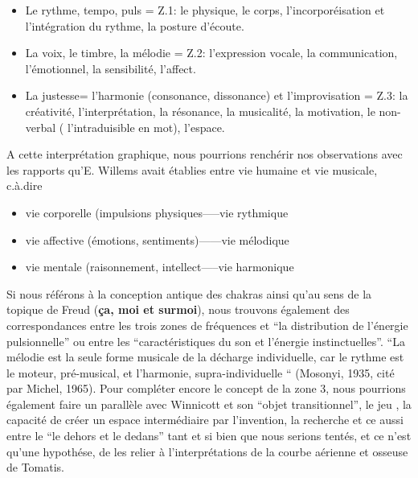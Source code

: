 \begin{itemize}
 \item Le rythme, tempo, puls  =  Z.1: le physique, le corps, l'incorporéisation et
l'intégration du rythme,
la posture d'écoute.

\item La voix, le timbre, la mélodie =  Z.2:  l'expression vocale, la communication,
l'émotionnel, la sensibilité, l'affect.

\item La justesse= l'harmonie (consonance, dissonance) et l'improvisation = Z.3:  la créativité, l'interprétation, la
résonance, la musicalité, la motivation, le non-verbal (
l'intraduisible en mot), l'espace.

\end{itemize}
A cette interprétation graphique, nous pourrions renchérir nos
observations avec les rapports
qu'E.
Willems  avait établies entre vie humaine et vie musicale, c.à.dire
\begin{itemize}
  \item vie corporelle (impulsions physiques-----vie rythmique
  \item vie affective (émotions, sentiments)------vie mélodique
    \item vie mentale (raisonnement, intellect-----vie harmonique
\end{itemize}

Si nous référons à la conception antique des chakras ainsi qu'au sens de la
topique de Freud (\textbf{ça, moi et surmoi}), nous trouvons également des correspondances
entre les trois zones de 
fréquences et ``la distribution de l'énergie pulsionnelle'' ou entre
les 
``caractéristiques du son et l'énergie instinctuelles''. \autocite[ch. 13]{auriol:cle} 
``La mélodie est la seule forme musicale de la décharge individuelle, car le rythme est le moteur, pré-musical, et l'harmonie, supra-individuelle `` (Mosonyi, 1935, cité par Michel, 1965).
Pour compléter encore le concept de la zone 3, nous pourrions
également faire un parallèle avec Winnicott et son ``objet
transitionnel'', le jeu , la capacité de créer un espace
intermédiaire par l'invention, la recherche et ce aussi entre le ``le
dehors et le dedans'' tant et si bien que nous serions tentés, et ce n'est qu'une
hypothése, de les relier à l'interprétations de la courbe aérienne et osseuse de Tomatis. 
 
